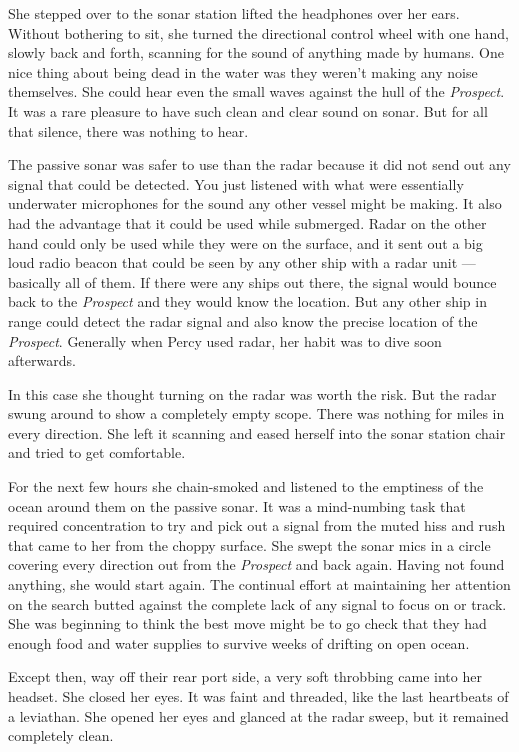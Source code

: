 \documentclass[
]{scrbook}
\begin{document}
She stepped over to the sonar station lifted the headphones over her
ears. Without bothering to sit, she turned the directional control wheel
with one hand, slowly back and forth, scanning for the sound of anything
made by humans. One nice thing about being dead in the water was they
weren't making any noise themselves. She could hear even the small waves
against the hull of the \emph{Prospect}. It was a rare pleasure to have
such clean and clear sound on sonar. But for all that silence, there was
nothing to hear.

The passive sonar was safer to use than the radar because it did not
send out any signal that could be detected. You just listened with what
were essentially underwater microphones for the sound any other vessel
might be making. It also had the advantage that it could be used while
submerged. Radar on the other hand could only be used while they were on
the surface, and it sent out a big loud radio beacon that could be seen
by any other ship with a radar unit --- basically all of them. If there
were any ships out there, the signal would bounce back to the
\emph{Prospect} and they would know the location. But any other ship in
range could detect the radar signal and also know the precise location
of the \emph{Prospect}. Generally when Percy used radar, her habit was
to dive soon afterwards.

In this case she thought turning on the radar was worth the risk. But
the radar swung around to show a completely empty scope. There was
nothing for miles in every direction. She left it scanning and eased
herself into the sonar station chair and tried to get comfortable.

For the next few hours she chain-smoked and listened to the emptiness of
the ocean around them on the passive sonar. It was a mind-numbing task
that required concentration to try and pick out a signal from the muted
hiss and rush that came to her from the choppy surface. She swept the
sonar mics in a circle covering every direction out from the
\emph{Prospect} and back again. Having not found anything, she would
start again. The continual effort at maintaining her attention on the
search butted against the complete lack of any signal to focus on or
track. She was beginning to think the best move might be to go check
that they had enough food and water supplies to survive weeks of
drifting on open ocean.

Except then, way off their rear port side, a very soft throbbing came
into her headset. She closed her eyes. It was faint and threaded, like
the last heartbeats of a leviathan. She opened her eyes and glanced at
the radar sweep, but it remained completely clean.
\end{document}
